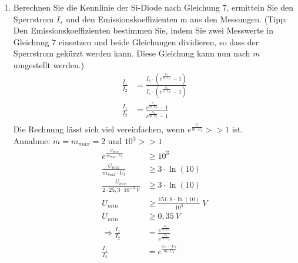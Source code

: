 \begin{enumerate}[label=\alph*)]
	      \pagebreak
	\item Berechnen Sie die Kennlinie der Si-Diode nach Gleichung 7, ermitteln Sie den Sperrstrom $I_s$ und den Emissionskoeffizienten m aus den Messungen. (Tipp: Den Emissionskoeffizienten bestimmen Sie, indem Sie zwei Messwerte in Gleichung 7 einsetzen und beide Gleichungen dividieren, so dass der Sperrstrom gekürzt werden kann. Diese Gleichung kann nun nach $m$ umgestellt werden.)
	      \begin{align*}
		      \frac{I_1}{I_2} & = \frac{I_s \cdot \left(e^\frac{U_1}{m\cdot U_T} - 1 \right)}
		      {I_s \cdot \left(e^\frac{U_2}{m\cdot U_T} - 1 \right)}                          \\
		      \frac{I_1}{I_2} & = \frac{e^\frac{U_1}{m\cdot U_T} - 1 }
		      {e^\frac{U_2}{m\cdot U_T} - 1}                                                  \\
	      \end{align*}
	      Die Rechnung lässt sich viel vereinfachen, wenn $\displaystyle{e^\frac{U}{m\cdot U_t} >> 1}$ ist. \\
	      Annahme: $m = m_{max} = 2$ und $10^3 >> 1$
	      \begin{align*}
		      e^\frac{U_{min}}{m_{max}\cdot U_t}         & \geq 10^3                                                    \\
		      \frac{U_{min}}{m_{max}\cdot U_t}           & \geq 3\cdot \ln(10)                                          \\
		      \frac{U_{min}}{2\cdot 25,3\cdot10^{-3}\ V} & \geq 3\cdot \ln(10)                                          \\
		      U_{min}                                    & \geq \frac{151,8\cdot \ln(10)}{10^3}\ V                      \\
		      U_{min}                                    & \geq 0,35\ V                                                 \\
		      \Rightarrow
		      \frac{I_1}{I_2}                            & = \frac{e^\frac{U_1}{m\cdot U_T}}
		      {e^\frac{U_2}{m\cdot U_T}}                                                                                \\
		      \frac{I_1}{I_2}                            & = e^\frac{U_1-U_2}{m\cdot U_T}                               \\

\end{align*}
\end{enumerate}
